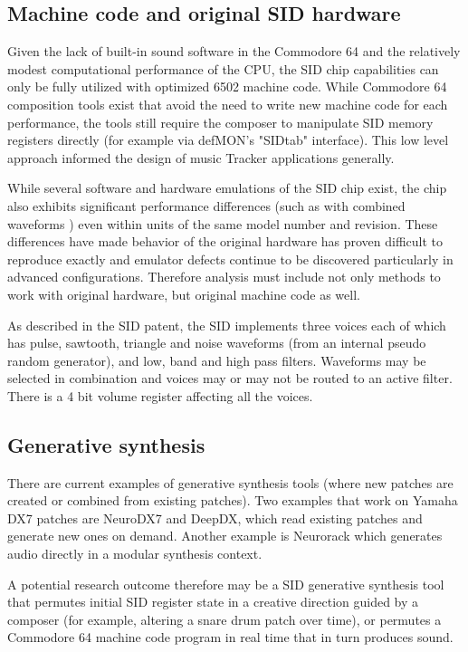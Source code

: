 \documentclass[10pt]{article}
\begin{document}
\begin{multicols*}{2}
\subsection{Machine code and original SID hardware}

Given the lack of built-in sound software in the Commodore 64 and the relatively modest computational performance of the CPU, the SID chip capabilities can only be fully utilized with optimized 6502 machine code\cite{c64digi}. While Commodore 64 composition tools exist that avoid the need to write new machine code for each performance, the tools still require the composer to manipulate SID memory registers directly (for example via defMON's\cite{defmon} "SIDtab" interface). This low level approach informed the design of music Tracker applications generally\cite{trackers}.

While several software and hardware emulations of the SID chip exist, the chip also exhibits significant performance differences (such as with combined waveforms \cite{fixcombwaveforms}) even within units of the same model number and revision. These differences have made behavior of the original hardware has proven difficult to reproduce exactly and emulator defects continue to be discovered particularly in advanced configurations. Therefore analysis must include not only methods to work with original hardware, but original machine code as well.

As described in the SID patent\cite{sidpatent}, the SID implements three voices each of which has pulse, sawtooth, triangle and noise waveforms (from an internal pseudo random generator), and low, band and high pass filters. Waveforms may be selected in combination and voices may or may not be routed to an active filter. There is a 4 bit volume register affecting all the voices.

\subsection{Generative synthesis}

There are current examples of generative synthesis tools (where new patches are created or combined from existing patches). Two examples that work on Yamaha DX7 patches are NeuroDX7\cite{neurodx7} and DeepDX\cite{deepdx}, which read existing patches and generate new ones on demand. Another example is Neurorack\cite{neurorack} which generates audio directly in a modular synthesis context.

A potential research outcome therefore may be a SID generative synthesis tool that permutes initial SID register state in a creative direction guided by a composer (for example, altering a snare drum patch over time), or permutes a Commodore 64 machine code program in real time that in turn produces sound.


\end{multicols*}
\end{document}
